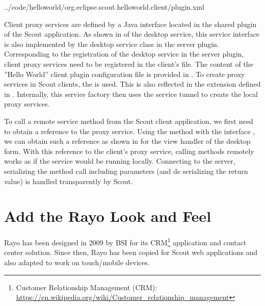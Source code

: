 \documentclass[a4paper,10pt,twoside]{book}
\begin{document}

{../code/helloworld/org.eclipse.scout.helloworld.client/plugin.xml}

Client proxy services are defined by a Java interface located in the shared plugin of the Scout application.
As shown in  of the desktop service, this service interface is also implemented by the desktop service class in the server plugin.
Corresponding to the registration of the desktop service in the server plugin, client proxy services need to be registered in the client's  file.
The content of the ''Hello World'' client plugin configuration file is provided in .
To create proxy services in Scout clients, the  is used. 
This is also reflected in the extension defined in .
Internally, this service factory then uses the service tunnel to create the local proxy services.

To call a remote service method from the Scout client application, we first need to obtain a reference to the proxy service.
Using the  method with the interface , we can obtain such a reference as shown in  for the view handler of the desktop form.
With this reference to the client's proxy service, calling methods remotely works as if the service would be running locally.
Connecting to the server, serializing the method call including parameters (and de serializing the return value) is handled transparently by Scout.

\section{Add the Rayo Look and Feel}

Rayo has been designed in 2009 by BSI for its CRM\footnote{
Customer Relationship Management (CRM): \url{https://en.wikipedia.org/wiki/Customer_relationship_management}} 
application and contact center solution.
Since then, Rayo has been copied for Scout web applications and also adapted to work on touch/mobile devices.
\end{document}
